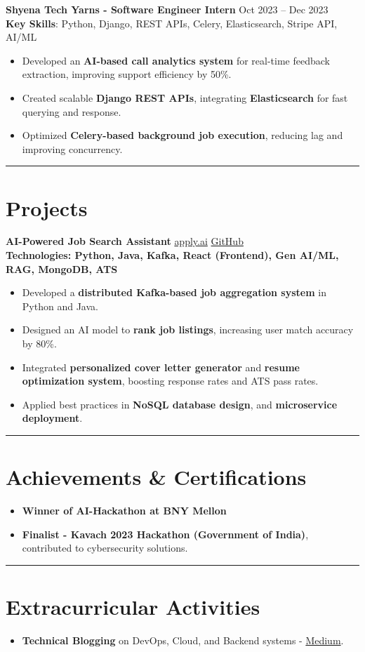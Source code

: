 \documentclass[a4paper,10.8pt]{article}
\begin{document}
\vspace{3 pt}
\textbf{Shyena Tech Yarns - Software Engineer Intern} \hfill Oct 2023 -- Dec 2023\\
\textbf{Key Skills}: Python, Django, REST APIs, Celery, Elasticsearch, Stripe API, AI/ML
\begin{itemize}
    \item Developed an \textbf{AI-based call analytics system} for real-time feedback extraction, improving support efficiency by 50\%.
    \item Created scalable \textbf{Django REST APIs}, integrating \textbf{Elasticsearch} for fast querying and response.
    \item Optimized \textbf{Celery-based background job execution}, reducing lag and improving concurrency.
\end{itemize}
\vspace{3 pt}

\hrule
\section*{Projects}
\textbf{AI-Powered Job Search Assistant} \hfill \href{https://carrer-ai.vercel.app/}{apply.ai} \textbar
\href{https://github.com/Yashrajput7232/apply.ai}{GitHub} \\
\textbf{Technologies: Python, Java, Kafka, React (Frontend), Gen AI/ML, RAG, MongoDB, ATS}
\begin{itemize}
    \item Developed a \textbf{distributed Kafka-based job aggregation system} in Python and Java.
    \item Designed an AI model to \textbf{rank job listings}, increasing user match accuracy by 80\%.
    \item Integrated \textbf{personalized cover letter generator} and \textbf{resume optimization system}, boosting response rates and ATS pass rates.
    \item Applied best practices in \textbf{NoSQL database design}, and \textbf{microservice deployment}.
\end{itemize}

\vspace{3 pt}

\hrule
\vspace{3pt}

\section*{Achievements \& Certifications}
\begin{itemize}
 \item \textbf{Winner of AI-Hackathon at BNY Mellon}
    \item \textbf{Finalist - Kavach 2023 Hackathon (Government of India)}, contributed to cybersecurity solutions.
    
\end{itemize}

\hrule
\vspace{3pt}

\section*{Extracurricular Activities}
\begin{itemize}
    \item \textbf{Technical Blogging} on DevOps, Cloud, and Backend systems - \href{https://medium.com/@yash.7232.rajput}{Medium}.
\end{itemize}
\end{document}
